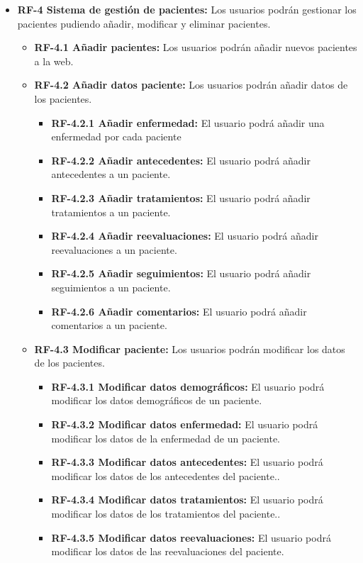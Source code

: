 \begin{itemize}
\begin{itemize}
    \end{itemize}
    \item \textbf{RF-4 Sistema de gestión de pacientes:} Los usuarios podrán
    gestionar los pacientes pudiendo añadir, modificar y eliminar pacientes.
    \begin{itemize}
        \item \textbf{RF-4.1 Añadir pacientes:} Los usuarios podrán añadir nuevos pacientes a la web.
        \item \textbf{RF-4.2 Añadir datos paciente:} Los usuarios podrán añadir datos de los pacientes.
        \begin{itemize}
            \item \textbf{RF-4.2.1 Añadir enfermedad:} El usuario podrá añadir una enfermedad por cada paciente
            \item \textbf{RF-4.2.2 Añadir antecedentes:} El usuario podrá añadir antecedentes a un paciente.
            \item \textbf{RF-4.2.3 Añadir tratamientos:} El usuario podrá añadir tratamientos a un paciente.
            \item \textbf{RF-4.2.4 Añadir reevaluaciones:} El usuario podrá añadir reevaluaciones a un paciente.
            \item \textbf{RF-4.2.5 Añadir seguimientos:} El usuario podrá añadir seguimientos a un paciente.
            \item \textbf{RF-4.2.6 Añadir comentarios:} El usuario podrá añadir comentarios a un paciente.
        \end{itemize}
        \item \textbf{RF-4.3 Modificar paciente:} Los usuarios podrán modificar los datos de los pacientes.
        \begin{itemize}
            \item \textbf{RF-4.3.1 Modificar datos demográficos:} El usuario podrá modificar los datos demográficos de un paciente.
            \item \textbf{RF-4.3.2 Modificar datos enfermedad:} El usuario podrá modificar los datos de la enfermedad de un paciente.
            \item \textbf{RF-4.3.3 Modificar datos antecedentes:} El usuario podrá modificar los datos de los antecedentes del paciente..
            \item \textbf{RF-4.3.4 Modificar datos tratamientos:} El usuario podrá modificar los datos de los tratamientos del paciente..
            \item \textbf{RF-4.3.5 Modificar datos reevaluaciones:} El usuario podrá modificar los datos de las reevaluaciones del paciente.

\end{itemize}
\end{itemize}
\end{itemize}
